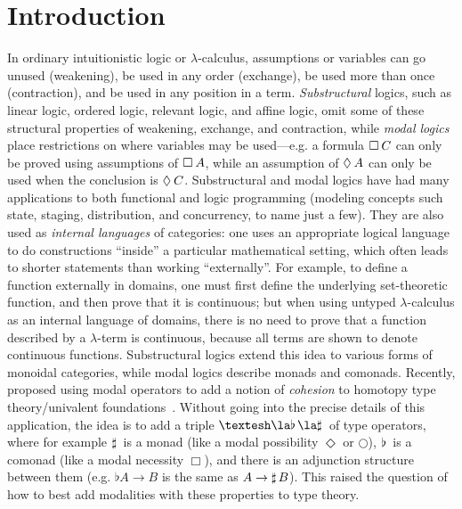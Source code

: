 
\section{Introduction}

In ordinary intuitionistic logic or $\lambda$-calculus, assumptions or
variables can go unused (weakening), be used in any order (exchange), be
used more than once (contraction), and be used in any position in a
term.  \emph{Substructural} logics, such as linear logic, ordered logic,
relevant logic, and affine logic, omit some of these structural
properties of weakening, exchange, and contraction, while \emph{modal
  logics} place restrictions on where variables may be used---e.g. a
formula $\Box_{} \, {C}$ can only be proved using assumptions of $\Box_{} \, {A}$,
while an assumption of $\Diamond_{} \, {A}$ can only be used when the conclusion
is $\Diamond_{} \, {C}$.  Substructural and modal logics have had many
applications to both functional and logic programming (modeling concepts
such state, staging, distribution, and concurrency, to name just a few).
They are also used as \emph{internal languages} of categories: one uses
an appropriate logical language to do constructions ``inside'' a
particular mathematical setting, which often leads to shorter statements
than working ``externally''.  For example, to define a function
externally in domains, one must first define the underlying
set-theoretic function, and then prove that it is continuous; but when
using untyped $\lambda$-calculus as an internal language of domains,
there is no need to prove that a function described by a $\lambda$-term
is continuous, because all terms are shown to denote continuous
functions.  Substructural logics extend this idea to
various forms of monoidal categories, while modal logics describe monads
and comonads.  Recently,
\citet{schreibershulman12cohesive,shulman15realcohesion} proposed using
modal operators to add a notion of \emph{cohesion} to homotopy type
theory/univalent foundations~\citep{voevodsky06homotopy,uf13hott-book}.
Without going into the precise details of this application, the idea is
to add a triple $\sh{} \la \Flat{} \la \Sharp{}$ of type operators,
where for example $\sharp \, {}$ is a monad (like a modal possibility
$\Diamond$ or $\bigcirc$), $\flat \, {}$ is a comonad (like a modal
necessity $\Box$), and there is an adjunction structure between them
(e.g. $\flat{A} \to B$ is the same as $A \to \sharp \, {B}$).  This raised
the question of how to best add modalities with these properties to type
theory.

